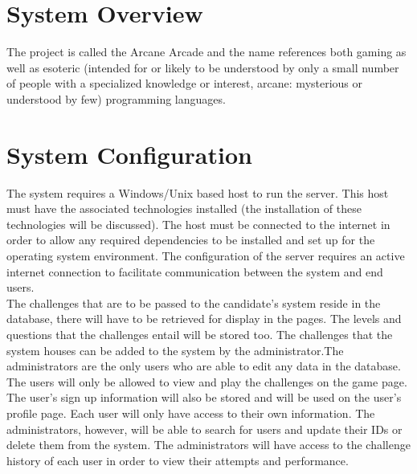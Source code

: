 \documentclass[english]{article}
\begin{document}
		
	\section{System Overview}
	The project is called the Arcane Arcade and the name references both gaming as well as esoteric (intended for or likely to be understood by only a 		small number of people with a specialized knowledge or interest, arcane: mysterious or understood by few) programming languages.
	
	\section{System Configuration}
	The system requires a Windows/Unix based host to run the server. This
host must have the associated technologies installed (the installation of these
technologies will be discussed). The host must be connected to the
internet in order to allow any required dependencies to be installed and set
up for the operating system environment. The configuration of the server
requires an active internet connection to facilitate communication between the
system and end users.\\
\newline
 The challenges that are to be passed to the candidate's system reside in the database, there will have to be retrieved for display in the pages. The levels and questions that the challenges entail will be stored too. The challenges that the system houses can be added to the system by the administrator.The administrators are the only users who are able to  edit any data in the database.
\newpage
 The users will only be allowed to view and play the challenges on the game page. The user's sign up information will also be stored and will be used on the user's profile page. Each user will only have access to their own information. The administrators, however, will be able to search for users and update their IDs or delete them from the system. The administrators will have access to the challenge history of each user in order to view their attempts and performance.
 \newline
\end{document}
